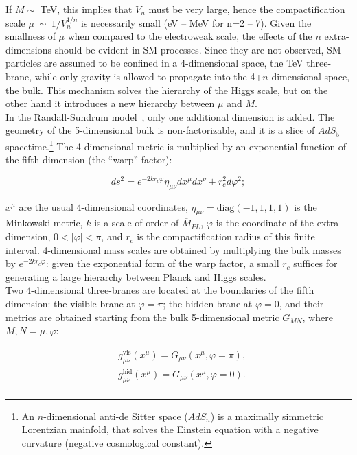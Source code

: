 \noindent If $M \sim$ TeV, this implies that $V_n$ must be very large, hence the compactification scale $\mu~\sim~1/V_n^{1/n}$ is necessarily small (eV -- MeV for n=2 -- 7).  Given the smallness of $\mu$ when compared to the electroweak scale, the effects of the $n$ extra-dimensions should be evident in SM processes. Since they are not observed, SM particles are assumed to be confined in a 4-dimensional space, the TeV three-brane, while only gravity is allowed to propagate into the 4+$n$-dimensional space, the bulk. This mechanism solves the hierarchy of the Higgs scale, but on the other hand it introduces a new hierarchy between $\mu$ and $M$.\\
In the Randall-Sundrum model~\cite{Randall:1999ee,Randall:1999vf}, only one additional dimension is added. The geometry of the 5-dimensional bulk is non-factorizable, and it is a slice of $AdS_5$ spacetime.\footnote{An $n$-dimensional anti-de Sitter space ($AdS_n$) is a maximally simmetric Lorentzian mainfold, that solves the Einstein equation with a negative curvature (negative cosmological constant).} The 4-dimensional metric is multiplied by an exponential function of the fifth dimension (the ``warp'' factor):

\begin{equation}
ds^2 = e^{-2 k r_c \varphi} \eta_{\mu \nu} dx^{\mu} dx^{\nu} + r_c^2 d{\varphi}^2;
\label{eq:theory_metric}
\end{equation}

\noindent $x^{\mu}$ are the usual 4-dimensional coordinates, $\eta_{\mu \nu} = \text{diag}(-1, 1, 1, 1)$ is the Minkowski metric, $k$ is a scale of order of $\overline{M}_{PL}$, $\varphi$ is the coordinate of the extra-dimension, $0 < |\varphi| < \pi$, and $r_c$ is the compactification radius of this finite interval. 4-dimensional mass scales are obtained by multiplying the bulk masses by $e^{-2 k r_c \varphi}$: given the exponential form of the warp factor, a small $r_c$ suffices for generating a large hierarchy between Planck and Higgs scales.\\
Two 4-dimensional three-branes are located at the boundaries of the fifth dimension: the visible brane at $\varphi = \pi$; the hidden brane at $\varphi = 0$, and their metrics are obtained starting from the bulk 5-dimensional metric $G_{MN}$, where $M,N = \mu, \varphi$:

\begin{equation}
\begin{split}
 & g_{\mu \nu}^{\text{vis}} (x^{\mu}) = G_{\mu \nu} \left( x^{\mu}, \varphi = \pi \right),\\
 & g_{\mu \nu}^{\text{hid}} (x^{\mu}) = G_{\mu \nu} \left( x^{\mu}, \varphi = 0 \right).\\
\end{split}
\label{eq:theory_brane_metrics}
\end{equation}


